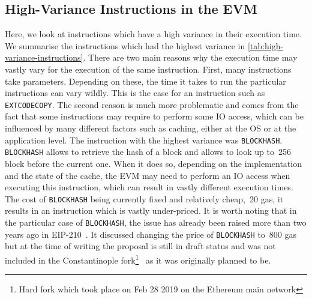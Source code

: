 \subsection{High-Variance Instructions in the EVM}
Here, we look at instructions which have a high variance in their execution time.
We summarise the instructions which had the highest variance in \autoref{tab:high-variance-instructions}.
There are two main reasons why the execution time may vastly vary for the execution of the same instruction.
First, many instructions take parameters.
Depending on these, the time it takes to run the particular instructions can vary wildly.
This is the case for an instruction such as \lstinline{EXTCODECOPY}.
The second reason is much more problematic and comes from the fact that some instructions may require to perform some IO access, which can be influenced by many different factors such as caching, either at the OS or at the application level.
The instruction with the highest variance was \lstinline{BLOCKHASH}.
\lstinline{BLOCKHASH} allows to retrieve the hash of a block and allows to look up to~256 block before the current one.
When it does so, depending on the implementation and the state of the cache, the EVM may need to perform an IO access when executing this instruction, which can result in vastly different execution times.
The cost of \lstinline{BLOCKHASH} being currently fixed and relatively cheap,~20 gas, it results in an instruction which is vastly under-priced. It is worth noting that in the particular case of \lstinline{BLOCKHASH}, the issue has already been raised more than two years ago in EIP-210~\cite{eip-blockhash}.
It discussed changing the price of \lstinline{BLOCKHASH} to~800 gas but at the time of writing the proposal is still in draft status and was not included in the Constantinople fork\footnote{Hard fork which took place on Feb 28 2019 on the Ethereum main network}~\cite{constantinople} as it was originally planned to be.

